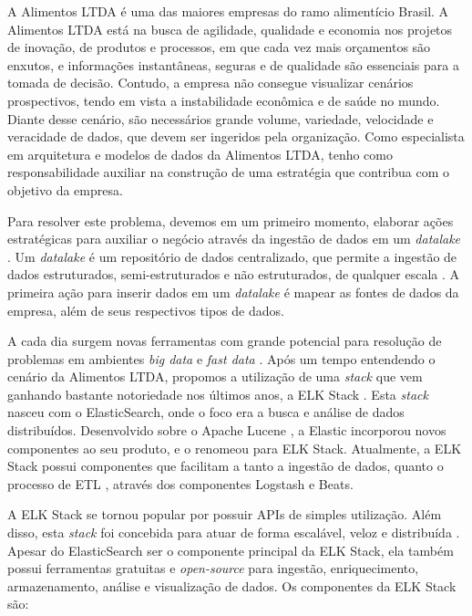 A Alimentos LTDA é uma das maiores empresas do ramo alimentício Brasil. A Alimentos LTDA está na busca de agilidade, qualidade e economia nos projetos de inovação, de produtos e processos, em que cada vez mais orçamentos são enxutos, e informações instantâneas, seguras e de qualidade são essenciais para a tomada de decisão. Contudo, a empresa não consegue visualizar cenários prospectivos, tendo em vista a instabilidade econômica e de saúde no mundo. Diante desse cenário, são necessários grande volume, variedade, velocidade e veracidade de dados, que devem ser ingeridos pela organização. Como especialista em arquitetura e modelos de dados da Alimentos LTDA, tenho como responsabilidade auxiliar na construção de uma estratégia que contribua com o objetivo da empresa.


Para resolver este problema, devemos em um primeiro momento, elaborar ações estratégicas para auxiliar o negócio através da ingestão de dados em um \textit{datalake} \cite{khine2018data}. Um \textit{datalake} é um repositório de dados centralizado, que permite a ingestão de dados estruturados, semi-estruturados e não estruturados, de qualquer escala \cite{khine2018data}. A primeira ação para inserir dados em um \textit{datalake} é mapear as fontes de dados da empresa, além de seus respectivos tipos de dados.

A cada dia surgem novas ferramentas com grande potencial para resolução de problemas em ambientes \textit{big data} e \textit{fast data} \cite{miloslavskaya2016big}. Após um tempo entendendo o cenário da Alimentos LTDA, propomos a utilização de uma \textit{stack} que vem ganhando bastante notoriedade nos últimos anos, a ELK Stack \cite{chhajed2015learning}. Esta \textit{stack} nasceu com o ElasticSearch, onde o foco era a busca e análise de dados distribuídos. Desenvolvido sobre o Apache Lucene \cite{lucene2010apache}, a Elastic incorporou novos componentes ao seu produto, e o renomeou para ELK Stack. Atualmente, a ELK Stack possui componentes que facilitam a tanto a ingestão de dados, quanto o processo de ETL \cite{vassiliadis2002conceptual}, através dos componentes Logstash e Beats. 

A ELK Stack se tornou popular por possuir APIs de simples utilização. Além disso, esta \textit{stack} foi concebida para atuar de forma escalável, veloz e distribuída \cite{son2017performance}. Apesar do ElasticSearch ser o componente principal da ELK Stack, ela também possui ferramentas gratuitas e \textit{open-source} para ingestão, enriquecimento, armazenamento, análise e visualização de dados. Os componentes da ELK Stack são:

